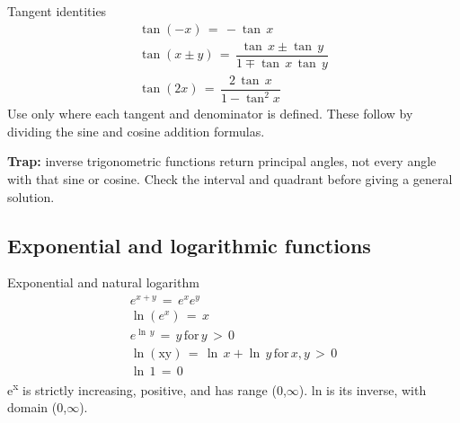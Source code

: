 \documentclass[11pt]{article}
\begin{document}
\begin{keepsection}
\begin{keepsection}
\begin{equationcard}{Tangent identities}
\[ \begin{gathered} \tan (-{x})\, =\, -\tan \, {x} \\ \tan ({x}\pm {y})\, =\, \dfrac{\tan \, {x}\pm \tan \, {y}}{1\mp \tan \, {x}\, \tan \, {y}} \\ \tan (2{x})\, =\, \dfrac{2\, \tan \, {x}}{1-\tan ^{2}{x}} \end{gathered} \]
{\small Use only where each tangent and denominator is defined. These follow by dividing the sine and cosine addition formulas.}
\end{equationcard}

\begin{notebox}\textbf{Trap:} inverse trigonometric functions return principal angles, not every angle with that sine or cosine. Check the interval and quadrant before giving a general solution.\end{notebox}
\end{keepsection}

\begin{keepsection}
\subsection{Exponential and logarithmic functions}

\begin{equationcard}{Exponential and natural logarithm}
\[ \begin{gathered} {e}^{{x}+{y}}\, =\, {e}^{{x}}{e}^{{y}} \\ \ln ({e}^{{x}})\, =\, {x} \\ {e}^{\ln \, {y}}\, =\, {y}\, \text{for}\, {y}\, >\, 0 \\ \ln (\text{xy})\, =\, \ln \, {x}+\ln \, {y}\, \text{for}\, {x},{y}\, >\, 0 \\ \ln \, 1\, =\, 0 \end{gathered} \]
{\small e\textsuperscript{x} is strictly increasing, positive, and has range (0,\ensuremath{\infty}). ln is its inverse, with domain (0,\ensuremath{\infty}).}
\end{equationcard}


\end{keepsection}
\end{keepsection}
\end{document}
